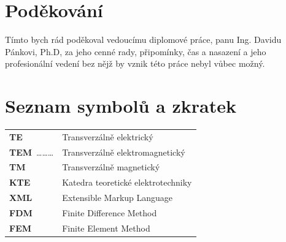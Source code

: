 \documentclass[12pt,a4paper,oneside]{article}
\numberwithin{equation}{section} %
\numberwithin{figure}{section} %
\numberwithin{table}{section} %
\begin{document}
\vspace*{50mm}
\section*{Poděkování}
Tímto bych rád poděkoval vedoucímu diplomové práce, panu Ing. Davidu Pánkovi, Ph.D, za jeho cenné rady, připomínky, čas a nasazení a jeho profesionální vedení bez nějž by vznik této práce nebyl vůbec možný.\\
\newpage


\cfoot{-~\thepage ~-}
\pagestyle{fancy}
\setcounter{page}{1}


\setlength{\parskip}{0ex} %
\tableofcontents
\newpage


\section*{Seznam symbolů a zkratek}

\begin{tabular}{ll}
\textbf{TE}\dotfill & Transverzálně elektrický \\  
\textbf{TEM}~\ldots\ldots\ldots & Transverzálně elektromagnetický \\ 
\textbf{TM}\dotfill & Transverzálně magnetický \\ 

\textbf{KTE}\dotfill & Katedra teoretické elektrotechniky \\
\textbf{XML}\dotfill & Extensible Markup Language \\
\textbf{FDM}\dotfill & Finite Difference Method \\
\textbf{FEM}\dotfill & Finite Element Method \\


\end{tabular} 
\end{document}
